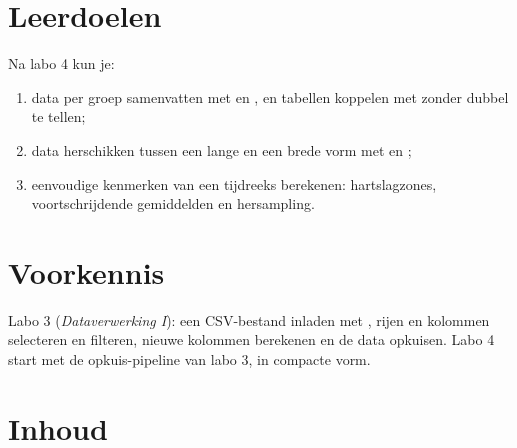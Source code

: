 \documentclass[11pt,a4paper]{article}
\begin{document}



\section{Leerdoelen}

Na labo 4 kun je:

\begin{enumerate}[label=\textbf{LD\arabic*}, leftmargin=1.4cm]
  \item data per groep samenvatten met  en , en
        tabellen koppelen met  zonder dubbel te tellen;
  \item data herschikken tussen een lange en een brede vorm met
         en ;
  \item eenvoudige kenmerken van een tijdreeks berekenen: hartslagzones,
        voortschrijdende gemiddelden en hersampling.
\end{enumerate}

\section{Voorkennis}

Labo 3 (\emph{Dataverwerking I}): een CSV-bestand inladen met
, rijen en kolommen selecteren en filteren, nieuwe kolommen
berekenen en de data opkuisen. Labo 4 start met de opkuis-pipeline van
labo 3, in compacte vorm.





\section{Inhoud}



\end{document}
